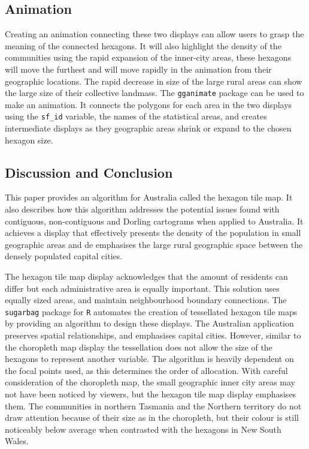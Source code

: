 \hypertarget{animation}{%
\subsection{Animation}\label{animation}}

Creating an animation connecting these two displays can allow users to
grasp the meaning of the connected hexagons. It will also highlight the
density of the communities using the rapid expansion of the inner-city
areas, these hexagons will move the furthest and will move rapidly in
the animation from their geographic locations. The rapid decrease in
size of the large rural areas can show the large size of their
collective landmass. The \texttt{gganimate} \citep{gganimate} package
can be used to make an animation. It connects the polygons for each area
in the two displays using the \texttt{sf\_id} variable, the names of the
statistical areas, and creates intermediate displays as they geographic
areas shrink or expand to the chosen hexagon size.

\hypertarget{conclusion-03}{%
\subsection{Discussion and Conclusion}\label{conclusion-03}}

This paper provides an algorithm for Australia called the hexagon tile
map. It also describes how this algorithm addresses the potential issues
found with contiguous, non-contiguous and Dorling cartograms when
applied to Australia. It achieves a display that effectively presents
the density of the population in small geographic areas and de
emphasises the large rural geographic space between the densely
populated capital cities.

The hexagon tile map display acknowledges that the amount of residents
can differ but each administrative area is equally important. This
solution uses equally sized areas, and maintain neighbourhood boundary
connections. The \texttt{sugarbag} package for \texttt{R} automates the
creation of tessellated hexagon tile maps by providing an algorithm to
design these displays. The Australian application preserves spatial
relationships, and emphasises capital cities. However, similar to the
choropleth map display the tessellation does not allow the size of the
hexagons to represent another variable. The algorithm is heavily
dependent on the focal points used, as this determines the order of
allocation. With careful consideration of the choropleth map, the small
geographic inner city areas may not have been noticed by viewers, but
the hexagon tile map display emphasises them. The communities in
northern Tasmania and the Northern territory do not draw attention
because of their size as in the choropleth, but their colour is still
noticeably below average when contrasted with the hexagons in New South
Wales.

